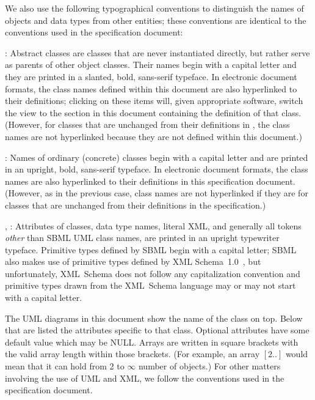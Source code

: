 We also use the following typographical conventions to distinguish the
names of objects and data types from other entities; these conventions
are identical to the conventions used in the \sbmlthreecore specification
document:

\begin{description}

\item {}: Abstract classes are classes that
  are never instantiated directly, but rather serve as parents of other
  object classes.  Their names begin with a capital letter and they are
  printed in a slanted, bold, sans-serif typeface.  In electronic
  document formats, the class names defined within this document are
  also hyperlinked to their definitions; clicking
  on these items will, given appropriate software, switch the view to
  the section in this document containing the definition of that class.
  (However, for classes that are unchanged from their definitions in
  \sbmlthreecore, the class names are not hyperlinked because they
  are not defined within this document.)

\item {}: Names of ordinary (concrete) classes begin with a
  capital letter and are printed in an upright, bold, sans-serif
  typeface.  In electronic document formats, the class names are also
  hyperlinked to their definitions in this specification document.
  (However, as in the previous case, class names are not hyperlinked if
  they are for classes that are unchanged from their definitions in the
  \sbmlthreecore specification.)

\item {}, : Attributes of classes, data
  type names, literal XML, and generally all tokens \emph{other} than
  SBML UML class names, are printed in an upright typewriter typeface.
  Primitive types defined by SBML begin with a capital letter; SBML also
  makes use of primitive types defined by XML
  Schema~1.0~\citep{biron:2000,fallside:2000,thompson:2000}, but
  unfortunately, XML~Schema does not follow any capitalization
  convention and primitive types drawn from the XML~Schema language may
  or may not start with a capital letter.

\end{description}

The UML diagrams in this document show the name of the class on top. 
Below that are listed the attributes specific to that class. Optional attributes 
have some default value which may be NULL. Arrays are written in square 
brackets with the valid array length within those brackets. (For example, an 
array $[2..]$ would mean that it can hold from 2 to $\infty$ number of 
objects.)  For other matters involving the use of UML and XML, we follow the 
conventions used in the \sbmlthreecore specification document. 



